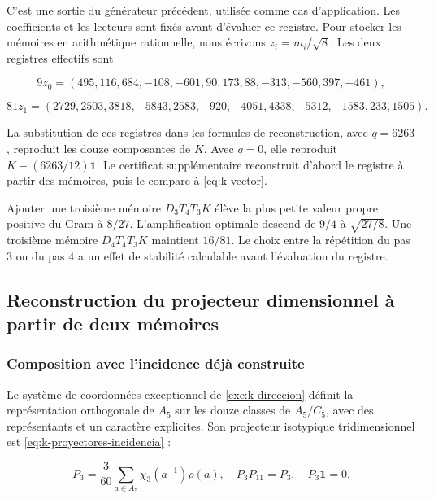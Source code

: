 C’est une sortie du générateur précédent, utilisée comme cas
d’application. Les coefficients et les lecteurs sont fixés avant
d’évaluer ce registre. Pour stocker les mémoires en arithmétique
rationnelle, nous écrivons \(z_i=m_i/\sqrt8\).
Les deux registres effectifs sont




\[
9z_0=(495,116,684,-108,-601,90,173,88,-313,-560,397,-461),
\]





\begin{equation}
81z_1=(2729,2503,3818,-5843,2583,-920,-4051,4338,-5312,-1583,233,1505).
\label{nuc11:eq:11}
\end{equation}



La substitution de ces registres dans les formules de reconstruction,
avec \(q=6263\), reproduit les douze composantes de \(K\).
Avec \(q=0\), elle reproduit \(K-(6263/12)\mathbf1\).
Le certificat supplémentaire reconstruit d’abord le registre à partir
des mémoires, puis le compare à \eqref{eq:k-vector}.

Ajouter une troisième mémoire \(D_3T_4T_3K\) élève la plus petite valeur
propre positive du Gram à \(8/27\).
L’amplification optimale descend de \(9/4\) à \(\sqrt{27/8}\).
Une troisième mémoire \(D_4T_4T_3K\) maintient \(16/81\).
Le choix entre la répétition du pas \(3\) ou du pas \(4\) a
un effet de stabilité calculable avant l’évaluation du registre.

\subsection{Reconstruction du projecteur dimensionnel à partir de deux mémoires
}

\subsubsection{Composition avec l’incidence déjà construite}

Le système de coordonnées exceptionnel de \cref{exc:k-direccion} définit la
représentation orthogonale de \(A_5\) sur les douze classes de
\(A_5/C_5\), avec des représentants et un caractère explicites.
Son projecteur isotypique tridimensionnel est
\eqref{eq:k-proyectores-incidencia} :



\begin{equation}
P_3=\frac3{60}\sum_{a\in A_5}\chi_3(a^{-1})\rho(a),
\quad P_3P_{11}=P_3,\quad P_3\mathbf1=0.
\label{nuc11:eq:12}
\end{equation}




